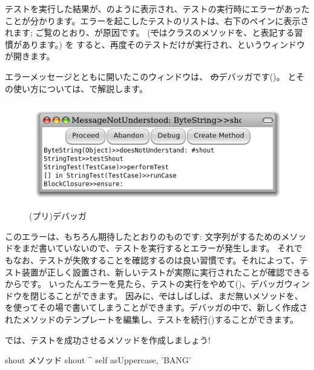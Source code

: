 \documentclass[a4paper,10pt,twoside]{book}
\begin{document}
テストを実行した結果が、のように表示され、テストの実行時にエラーがあったことが分かります。エラーを起こしたテストのリストは、右下のペインに表示されます; ご覧のとおり、が原因です。
(\st ではクラスのメソッドを、と表記する習慣があります。)
 を \click すると、再度そのテストだけが実行され、というウィンドウが開きます。

エラーメッセージとともに開いたこのウィンドウは、 \st のデバッガです()。
とその使い方については、で解説します。

\begin{figure}[hbt]
\centerline {\includegraphics[width=\textwidth]{Predebugger}}
\caption{(プリ)デバッガ}
\end{figure}

このエラーは、もちろん期待したとおりのものです: 文字列がするためのメソッドをまだ書いていないので、テストを実行するとエラーが発生します。
それでもなお、テストが失敗することを確認するのは良い習慣です。それによって、テスト装置が正しく設置され、新しいテストが実際に実行されたことが確認できるからです。
いったんエラーを見たら、テストの実行をやめて()、デバッガウィンドウを閉じることができます。
因みに、\st ではしばしば、まだ無いメソッドを、を使ってその場で書いてしまうことができます。デバッガの中で、新しく作成されたメソッドのテンプレートを編集し、テストを続行()することができます。

では、テストを成功させるメソッドを作成しましょう!

\begin{method}[shout]{shout メソッド}
shout
	^ self asUppercase, 'BANG'
\end{method}
\end{document}
